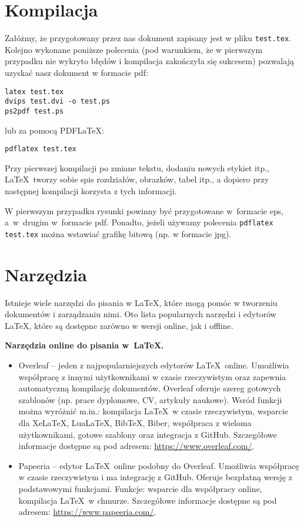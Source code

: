 \section{Kompilacja}
\label{sec:kompilacja}


Załóżmy, że przygotowany przez nas dokument zapisany jest w pliku \texttt{test.tex}. Kolejno wykonane poniższe polecenia (pod warunkiem, że w pierwszym przypadku nie wykryto błędów i kompilacja zakończyła się sukcesem) pozwalają uzyskać nasz dokument w formacie pdf:
\begin{lstlisting}
latex test.tex
dvips test.dvi -o test.ps
ps2pdf test.ps
\end{lstlisting}
%
lub za pomocą PDF\LaTeX:
\begin{lstlisting}
pdflatex test.tex
\end{lstlisting}

Przy pierwszej kompilacji po zmiane tekstu, dodaniu nowych etykiet itp., \LaTeX~tworzy sobie spis rozdziałów, obrazków, tabel itp., a dopiero przy następnej kompilacji korzysta z tych informacji.

W pierwszym przypadku rysunki powinny być przygotowane w~formacie eps, a~w~drugim w~formacie pdf. Ponadto, jeżeli używamy polecenia \texttt{pdflatex test.tex} można wstawiać grafikę bitową (np. w formacie jpg).




\section{Narzędzia}
\label{sec:narzedzia}

Istnieje wiele narzędzi do pisania w \LaTeX, które mogą pomóc w tworzeniu dokumentów i zarządzaniu nimi. Oto lista popularnych narzędzi i edytorów \LaTeX, które są dostępne zarówno w wersji online, jak i offline.

\noindent \textbf{Narzędzia online do pisania w~\LaTeX.}
\begin{itemize}
      \item Overleaf -- jeden z najpopularniejszych edytorów \LaTeX~online. Umożliwia współpracę z innymi użytkownikami w czasie rzeczywistym oraz zapewnia automatyczną kompilację dokumentów. Overleaf oferuje szereg gotowych szablonów (np. prace dyplomowe, CV, artykuły naukowe). Wsród funkcji można wyróżnić m.in.: kompilacja \LaTeX~w czasie rzeczywistym, wsparcie dla XeLaTeX, LuaLaTeX, BibTeX, Biber, współpraca z wieloma użytkownikami, gotowe szablony oraz integracja z GitHub. Szczegółowe informacje dostępne są pod adresem: \url{https://www.overleaf.com/}.
      \item Papeeria -- edytor \LaTeX~online podobny do Overleaf. Umożliwia współpracę w czasie rzeczywistym i ma integrację z GitHub. Oferuje bezpłatną wersję z podstawowymi funkcjami. Funkcje: wsparcie dla współpracy online, kompilacja \LaTeX~w chmurze. Szczegółowe informacje dostępne są pod adresem: \url{https://www.papeeria.com/}.
\end{itemize}

